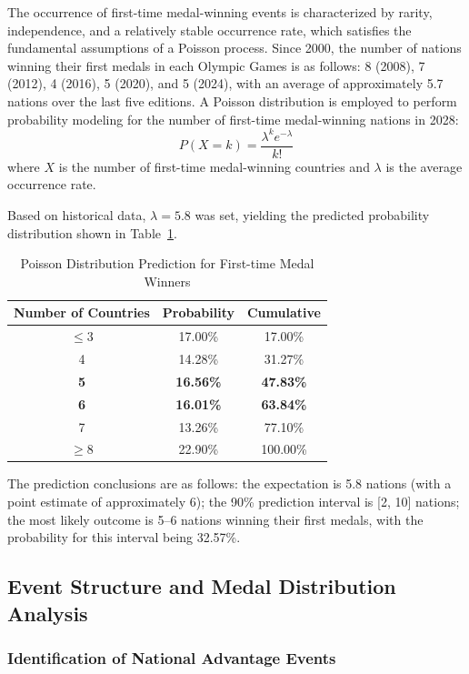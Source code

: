 \documentclass{mcmthesis}
\begin{document}
The occurrence of first-time medal-winning events is characterized by rarity, independence, and a relatively stable occurrence rate, which satisfies the fundamental assumptions of a Poisson process. Since 2000, the number of nations winning their first medals in each Olympic Games is as follows: 8 (2008), 7 (2012), 4 (2016), 5 (2020), and 5 (2024), with an average of approximately 5.7 nations over the last five editions. A Poisson distribution is employed to perform probability modeling for the number of first-time medal-winning nations in 2028:
\begin{equation}
    P(X = k) = \frac{\lambda^k e^{-\lambda}}{k!}
\end{equation}
where $X$ is the number of first-time medal-winning countries and $\lambda$ is the average occurrence rate.

Based on historical data, $\lambda = 5.8$ was set, yielding the predicted probability distribution shown in Table~\ref{tab:poisson}.

\begin{table}[H]
\centering
\caption{Poisson Distribution Prediction for First-time Medal Winners}
\label{tab:poisson}
\begin{tabular}{ccc}
\toprule
\textbf{Number of Countries} & \textbf{Probability} & \textbf{Cumulative} \\
\midrule
$\leq 3$ & 17.00\% & 17.00\% \\
4 & 14.28\% & 31.27\% \\
\textbf{5} & \textbf{16.56\%} & \textbf{47.83\%} \\
\textbf{6} & \textbf{16.01\%} & \textbf{63.84\%} \\
7 & 13.26\% & 77.10\% \\
$\geq 8$ & 22.90\% & 100.00\% \\
\bottomrule
\end{tabular}
\end{table}
The prediction conclusions are as follows: the expectation is 5.8 nations (with a point estimate of approximately 6); the 90\% prediction interval is [2, 10] nations; the most likely outcome is 5–6 nations winning their first medals, with the probability for this interval being 32.57\%.

\subsection{Event Structure and Medal Distribution Analysis}

\subsubsection{Identification of National Advantage Events}
\end{document}
